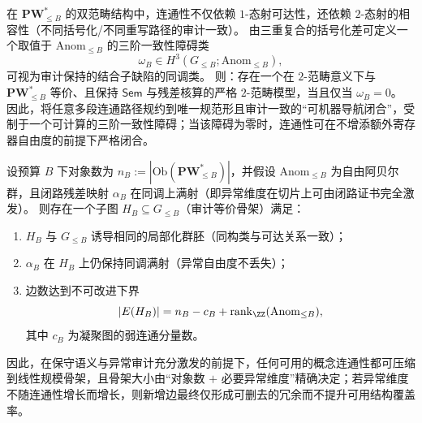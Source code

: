 \begin{conclusion}\label{con:xi-connectivity-third-order-strictification-obstruction}
在 \(\mathbf{PW}^{\ast}_{\le B}\) 的双范畴结构中，连通性不仅依赖 \(1\)-态射可达性，还依赖 \(2\)-态射的相容性（不同括号化/不同重写路径的审计一致）。
由三重复合的括号化差可定义一个取值于 \(\mathrm{Anom}_{\le B}\) 的三阶一致性障碍类
\[
\omega_B\in H^3(G_{\le B};\mathrm{Anom}_{\le B}),
\]
可视为审计保持的结合子缺陷的同调类。
则：存在一个在 \(2\)-范畴意义下与 \(\mathbf{PW}^{\ast}_{\le B}\) 等价、且保持 \(\mathsf{Sem}\) 与残差核算的严格 \(2\)-范畴模型，当且仅当 \(\omega_B=0\)。
因此，将任意多段连通路径规约到唯一规范形且审计一致的“可机器导航闭合”，受制于一个可计算的三阶一致性障碍；当该障碍为零时，连通性可在不增添额外寄存器自由度的前提下严格闭合。
\end{conclusion}

\begin{conclusion}\label{con:xi-connectivity-minimal-skeleton-linear-size}
设预算 \(B\) 下对象数为 \(n_B:=|\mathrm{Ob}(\mathbf{PW}^{\ast}_{\le B})|\)，并假设 \(\mathrm{Anom}_{\le B}\) 为自由阿贝尔群，且闭路残差映射 \(\alpha_B\) 在同调上满射（即异常维度在切片上可由闭路证书完全激发）。
则存在一个子图 \(H_B\subseteq G_{\le B}\)（审计等价骨架）满足：
\begin{enumerate}
  \item \(H_B\) 与 \(G_{\le B}\) 诱导相同的局部化群胚（同构类与可达关系一致）；\label{item:xi-skel-groupoid}
  \item \(\alpha_B\) 在 \(H_B\) 上仍保持同调满射（异常自由度不丢失）；\label{item:xi-skel-anom}
  \item 边数达到不可改进下界
  \[
  |E(H_B)| = n_B - c_B + \mathrm{rank}_{\ZZ}(\mathrm{Anom}_{\le B}),
  \]
  其中 \(c_B\) 为凝聚图的弱连通分量数。\label{item:xi-skel-size}
\end{enumerate}
因此，在保守语义与异常审计充分激发的前提下，任何可用的概念连通性都可压缩到线性规模骨架，且骨架大小由“对象数 \(+\) 必要异常维度”精确决定；若异常维度不随连通性增长而增长，则新增边最终仅形成可删去的冗余而不提升可用结构覆盖率。
\end{conclusion}

